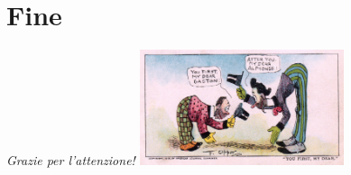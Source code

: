 \documentclass{../libs/presentation_format}
\begin{document}

\section{Fine}
\begin{frame}{}
	\huge\emph{Grazie per l'attenzione!}
	\newline
	\vfill
	\hfill\includegraphics[width=6cm]{../libs/alphonse-gaston-regards}
\end{frame}
\end{document}

